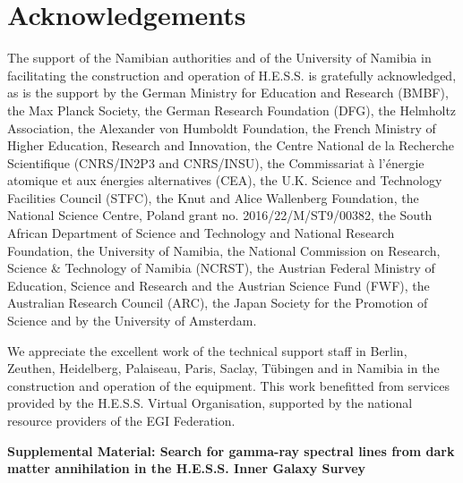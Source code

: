 \documentclass[aps,prl,twocolumn,floats,balancelastpage,showpacs,showkeys,preprintnumbers,floatfix,nofootinbib,superscriptaddress, longbibliography]{revtex4-1}
\begin{document}
\section{Acknowledgements}

The support of the Namibian authorities and of the University of Namibia in facilitating the construction and operation of H.E.S.S. is gratefully acknowledged, as is the support by the German Ministry for Education and Research (BMBF), the Max Planck Society, the German Research Foundation (DFG), the Helmholtz Association, the Alexander von Humboldt Foundation, the French Ministry of Higher Education, Research and Innovation, the Centre National de la Recherche Scientifique (CNRS/IN2P3 and CNRS/INSU), the Commissariat \`a l'\'energie atomique et aux \'energies alternatives (CEA), the U.K. Science and Technology Facilities Council (STFC), the Knut and Alice Wallenberg Foundation, the National Science Centre, Poland grant no. 2016/22/M/ST9/00382, the South African Department of Science and Technology and National Research Foundation, the University of Namibia, the National Commission on Research, Science \& Technology of Namibia (NCRST), the Austrian Federal Ministry of Education, Science and Research and the Austrian Science Fund (FWF), the Australian Research Council (ARC), the Japan Society for the Promotion of Science and by the University of Amsterdam.

We appreciate the excellent work of the technical support staff in Berlin, Zeuthen, Heidelberg, Palaiseau, Paris, Saclay, T\"ubingen and in Namibia in the construction and operation of the equipment. This work benefitted from services provided by the H.E.S.S. Virtual Organisation, supported by the national resource providers of the EGI Federation.

\newpage
\newpage




\appendix
\newpage
\setcounter{equation}{0}
\setcounter{figure}{0}
\widetext
\begin{center}
{\bf \large \large Supplemental Material: Search for gamma-ray spectral lines from dark matter annihilation in the H.E.S.S. Inner Galaxy Survey}
\end{center}


\end{document}
